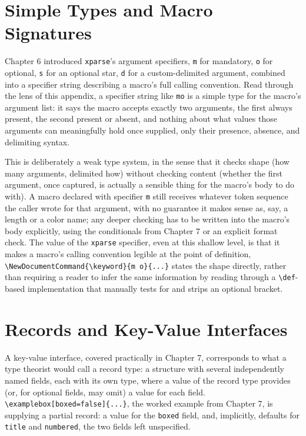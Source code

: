 \hypertarget{c.2-simple-types-and-macro-signatures}{%
\section{Simple Types and Macro Signatures}\label{c.2-simple-types-and-macro-signatures}}

Chapter 6 introduced \texttt{xparse}'s argument specifiers, \texttt{m} for mandatory, \texttt{o} for optional, \texttt{s} for an optional star, \texttt{d} for a custom-delimited argument, combined into a specifier string describing a macro's full calling convention. Read through the lens of this appendix, a specifier string like \texttt{mo} is a simple type for the macro's argument list: it says the macro accepts exactly two arguments, the first always present, the second present or absent, and nothing about what values those arguments can meaningfully hold once supplied, only their presence, absence, and delimiting syntax.

This is deliberately a weak type system, in the sense that it checks shape (how many arguments, delimited how) without checking content (whether the first argument, once captured, is actually a sensible thing for the macro's body to do with). A macro declared with specifier \texttt{m} still receives whatever token sequence the caller wrote for that argument, with no guarantee it makes sense as, say, a length or a color name; any deeper checking has to be written into the macro's body explicitly, using the conditionals from Chapter 7 or an explicit format check. The value of the \texttt{xparse} specifier, even at this shallow level, is that it makes a macro's calling convention legible at the point of definition, \texttt{\textbackslash{}NewDocumentCommand\{\textbackslash{}keyword\}\{m\ o\}\{...\}} states the shape directly, rather than requiring a reader to infer the same information by reading through a \texttt{\textbackslash{}def}-based implementation that manually tests for and strips an optional bracket.

\hypertarget{c.3-records-and-key-value-interfaces}{%
\section{Records and Key-Value Interfaces}\label{c.3-records-and-key-value-interfaces}}

A key-value interface, covered practically in Chapter 7, corresponds to what a type theorist would call a record type: a structure with several independently named fields, each with its own type, where a value of the record type provides (or, for optional fields, may omit) a value for each field. \texttt{\textbackslash{}examplebox{[}boxed=false{]}\{...\}}, the worked example from Chapter 7, is supplying a partial record: a value for the \texttt{boxed} field, and, implicitly, defaults for \texttt{title} and \texttt{numbered}, the two fields left unspecified.

